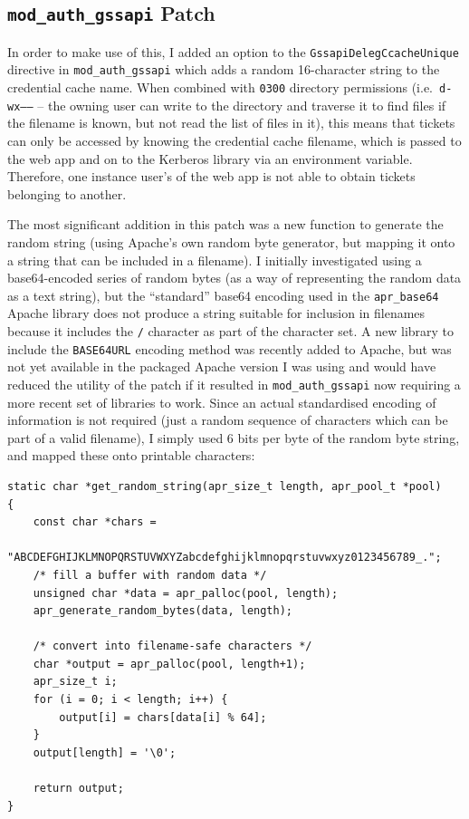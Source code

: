\documentclass[12pt]{report}
\begin{document}
\subsection{\texttt{mod\_auth\_gssapi} Patch}
In order to make use of this, I added an option to the \texttt{GssapiDelegCcacheUnique} directive in \verb+mod_auth_gssapi+ which adds a random 16-character string to the credential cache name. When combined with \texttt{0300} directory permissions (i.e.\ \texttt{d-wx------} -- the owning user can write to the directory and traverse it to find files if the filename is known, but not read the list of files in it), this means that tickets can only be accessed by knowing the credential cache filename, which is passed to the web app and on to the Kerberos library via an environment variable. Therefore, one instance user's of the web app is not able to obtain tickets belonging to another.

The most significant addition in this patch was a new function to generate the random string (using Apache's own random byte generator, but mapping it onto a string that can be included in a filename). I initially investigated using a base64-encoded series of random bytes (as a way of representing the random data as a text string), but the ``standard'' base64 encoding used in the \verb+apr_base64+ Apache library does not produce a string suitable for inclusion in filenames because it includes the \verb+/+ character as part of the character set\cite{RFC4648}. A new library to include the \texttt{BASE64URL} encoding method was recently added to Apache\cite{Apache-base64-commit}, but was not yet available in the packaged Apache version I was using and would have reduced the utility of the patch if it resulted in \verb+mod_auth_gssapi+ now requiring a more recent set of libraries to work. Since an actual standardised encoding of information is not required (just a random sequence of characters which can be part of a valid filename), I simply used 6 bits per byte of the random byte string, and mapped these onto printable characters:

\begin{verbatim}
static char *get_random_string(apr_size_t length, apr_pool_t *pool)
{
    const char *chars =
      "ABCDEFGHIJKLMNOPQRSTUVWXYZabcdefghijklmnopqrstuvwxyz0123456789_.";
    /* fill a buffer with random data */
    unsigned char *data = apr_palloc(pool, length);
    apr_generate_random_bytes(data, length);

    /* convert into filename-safe characters */
    char *output = apr_palloc(pool, length+1);
    apr_size_t i;
    for (i = 0; i < length; i++) {
        output[i] = chars[data[i] % 64];
    }
    output[length] = '\0';

    return output;
}
\end{verbatim}
\end{document}
